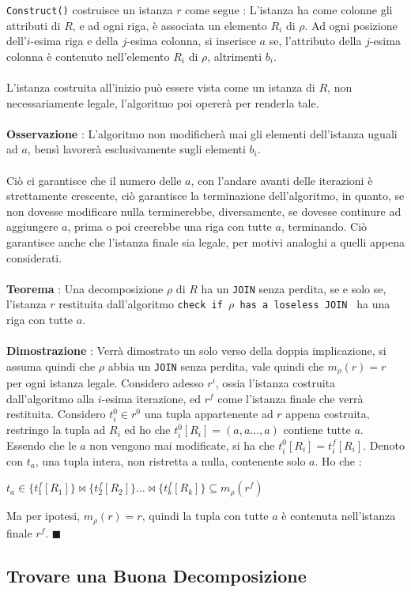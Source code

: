 \documentclass[12pt, letterpaper]{article}
\newcommand{\code}[1]{\colorbox{light-gray}{\texttt{#1}}}
\newcommand{\codee}[1]{\colorbox{white}{\texttt{#1}}}
\newcommand{\acc}{\\\hphantom{}\\}
\begin{document}
\code{Construct()} costruisce un istanza \(r\) come segue : L'istanza ha come colonne gli attributi di \(R\), 
 e ad ogni riga, è associata un elemento \(R_i\) di \(\rho\). Ad ogni posizione dell'\(i\)-esima riga
 e della \(j\)-esima colonna, si inserisce \(a\) se, l'attributo della \(j\)-esima colonna è  
contenuto nell'elemento \(R_i\) di \(\rho\), altrimenti \(b_i\). \acc 
L'istanza costruita all'inizio può essere vista come un istanza di \(R\), non necessariamente legale, l'algoritmo poi opererà 
per renderla tale.\acc 
\textbf{Osservazione} : L'algoritmo non modificherà mai gli elementi dell'istanza uguali ad \(a\), bensì lavorerà esclusivamente 
sugli elementi \(b_i\).\acc 
Ciò ci garantisce che il numero delle \(a\), con l'andare avanti delle iterazioni è strettamente crescente, ciò garantisce la 
terminazione dell'algoritmo, in quanto, se non dovesse modificare nulla terminerebbe, diversamente, se dovesse 
continure ad aggiungere \(a\), prima o poi creerebbe una riga con tutte \(a\), terminando. Ciò  garantisce 
anche che l'istanza finale sia legale, per motivi analoghi a quelli appena considerati.\acc 
\textbf{Teorema} : Una decomposizione \(\rho\) di \(R\) ha un  \codee{JOIN} senza perdita, se e solo se, l'istanza 
\(r\) restituita dall'algoritmo \codee{check if }\(\rho\)\codee{ has a loseless JOIN } ha una riga 
con tutte \(a\).\acc 
\textbf{Dimostrazione} : Verrà dimostrato un solo verso della doppia implicazione, si assuma quindi che 
\(\rho\) abbia un \codee{JOIN} senza perdita, vale quindi che  \(m_\rho(r)=r\) per ogni istanza legale. Considero 
adesso \(r^i\), ossia l'istanza costruita dall'algoritmo alla \(i\)-esima iterazione, ed \(r^f\) come l'istanza 
finale che verrà restituita. Considero \(t_i^0\in r^0\) una tupla appartenente ad \(r\) appena costruita, restringo 
la tupla ad \(R_i\) ed ho che \(t^0_i[R_i]=(a,a\dots,a)\) contiene tutte \(a\). Essendo che le \(a\) non vengono mai 
modificate, si ha che \(t^0_i[R_i]=t^f_i[R_i]\). Denoto con \(t_a\), una tupla intera, non ristretta a nulla, contenente 
solo \(a\). Ho che :\begin{center}
    \(t_a\in\{t_1^f[R_1]\}\Join\{t_2^f[R_2]\}\dots \Join\{t_k^f[R_k]\}\subseteq m_\rho(r^f)\)
\end{center}
Ma per ipotesi, \(m_\rho(r)=r\), quindi la tupla con tutte \(a\) è contenuta nell'istanza finale \(r^f\). \(\blacksquare\)
\subsection{Trovare una Buona Decomposizione}
\end{document}
